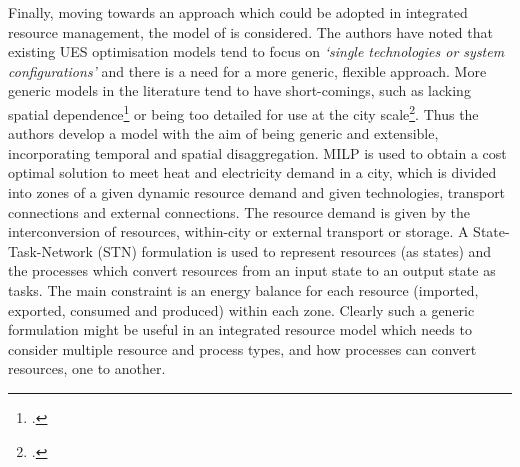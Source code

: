 Finally, moving towards an approach which could be adopted in integrated resource management, the model of \citet{Samsatli} is considered. The authors have noted that existing UES optimisation models tend to focus on \emph{`single technologies or system configurations'} and there is a need for a more generic, flexible approach. More generic models in the literature tend to have short-comings, such as lacking spatial dependence\footnote{\citet{Ren2010}.} or being too detailed for use at the city scale\footnote{\citet{Weber2011}.}. Thus the authors develop a model with the aim of being generic and extensible, incorporating temporal and spatial disaggregation. MILP is used to obtain a cost optimal solution to meet heat and electricity demand in a city, which is divided into zones of a given dynamic resource demand and given technologies, transport connections and external connections. The resource demand is given by the interconversion of resources, within-city or external transport or storage. A State-Task-Network (STN) formulation is used to represent resources (as states) and the processes which convert resources from an input state to an output state as tasks. The main constraint is an energy balance for each resource (imported, exported, consumed and produced) within each zone. Clearly such a generic formulation might be useful in an integrated resource model which needs to consider multiple resource and process types, and how processes can convert resources, one to another.


